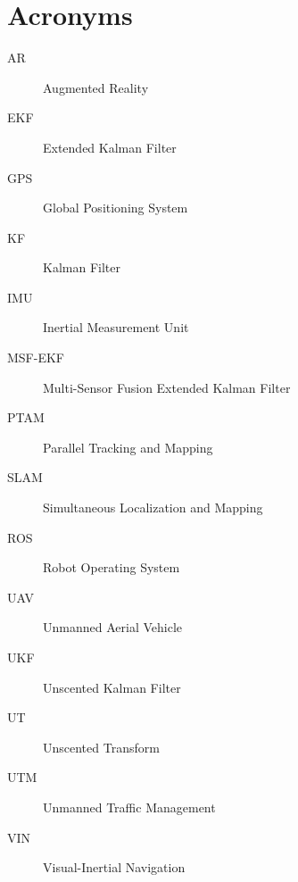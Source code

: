 \chapter*{Acronyms}

\begin{description}
\item [AR] Augmented Reality
\item [EKF] Extended Kalman Filter
\item [GPS] Global Positioning System
\item [KF] Kalman Filter
\item [IMU] Inertial Measurement Unit
\item [MSF-EKF] Multi-Sensor Fusion Extended Kalman Filter
\item [PTAM] Parallel Tracking and Mapping
\item [SLAM] Simultaneous Localization and Mapping
\item [ROS] Robot Operating System
\item [UAV] Unmanned Aerial Vehicle
\item [UKF] Unscented Kalman Filter
\item [UT] Unscented Transform
\item [UTM] Unmanned Traffic Management
\item [VIN] Visual-Inertial Navigation
\end{description}